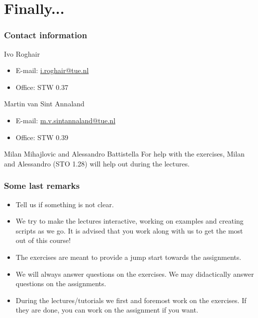 \documentclass[11pt,table,final,fleqn,xcolor={usenames,dvipsnames},handout]{beamer}
\begin{document}
\section{Finally...}
\begin{frame}
 \frametitle{Contact information}
 \begin{block}{Ivo Roghair}
  \begin{itemize}
   \item E-mail: \href{mailto:i.roghair@tue.nl}{i.roghair@tue.nl}
   \item Office: STW 0.37
   \end{itemize} 
 \end{block}
 \vspace{1em}
  \begin{block}{Martin van Sint Annaland}
  \begin{itemize}
   \item E-mail: \href{mailto:m.v.sintannaland@tue.nl}{m.v.sintannaland@tue.nl}
   \item Office: STW 0.39 
   \end{itemize} 
 \end{block}
 \begin{block}{Milan Mihajlovic and Alessandro Battistella}
    For help with the exercises, Milan and Alessandro (STO 1.28) will help out during the lectures.\\
  \end{block}
\end{frame}

\begin{frame}
 \frametitle{Some last remarks}
  \begin{itemize}
   \item Tell us if something is not clear.
   \item We try to make the lectures interactive, working on examples and creating scripts as we go. It is advised that you work along with us to get the most out of this course!
   \item The exercises are meant to provide a jump start towards the assignments.
   \item We will always answer questions on the exercises. We may didactically answer questions on the assignments.
   \item During the lectures/tutorials we first and foremost work on the exercises. If they are done, you can work on the assignment if you want.
   \end{itemize} 
\end{frame}
\end{document}
